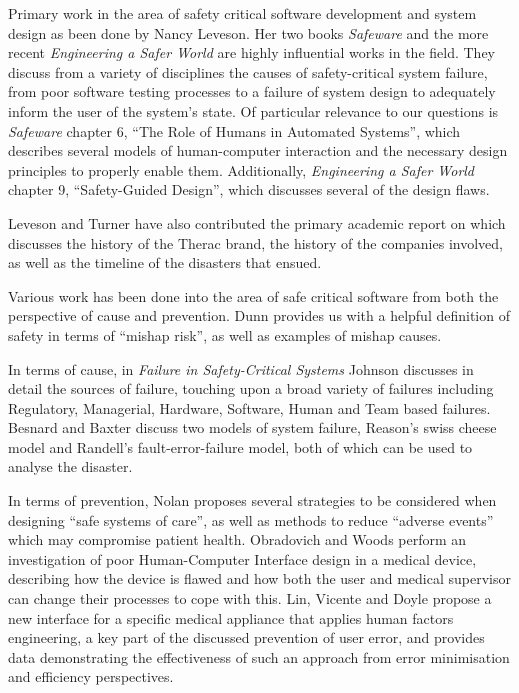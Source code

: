 \documentclass{cshonours}
\begin{document}
Primary work in the area of safety critical software development and system design as been done by Nancy Leveson. Her two books \textit{Safeware} \cite{safeware} and the more recent \textit{Engineering a Safer World} \cite{saferworld} are highly influential works in the field. They discuss from a variety of disciplines the causes of safety-critical system failure, from poor software testing processes to a failure of system design to adequately inform the user of the system's state. Of particular relevance to our \ther questions is \textit{Safeware} chapter 6, ``The Role of Humans in Automated Systems'', which describes several models of human-computer interaction and the necessary design principles to properly enable them. Additionally, \textit{Engineering a Safer World} chapter 9, ``Safety-Guided Design'', which discusses several of the \ther design flaws.

Leveson and Turner have also contributed the primary academic report on \ther \cite{leveson1993investigation} which discusses the history of the Therac brand, the history of the companies involved, as well as the timeline of the disasters that ensued.

Various work has been done into the area of safe critical software from both the perspective of cause and prevention. Dunn \cite{dunn2003designing} provides us with a helpful definition of safety in terms of ``mishap risk'', as well as examples of mishap causes.

In terms of cause, in \textit{Failure in Safety-Critical Systems} \cite[ch.~3]{johnson2003failure} Johnson discusses in detail the sources of failure, touching upon a broad variety of failures including Regulatory, Managerial, Hardware, Software, Human and Team based failures. Besnard and Baxter \etal \cite{besnard2003human} discuss two models of system failure, Reason's swiss cheese model and Randell's fault-error-failure model, both of which can be used to analyse the \ther disaster.

In terms of prevention, Nolan \cite{nolan2000system} proposes several strategies to be considered when designing ``safe systems of care'', as well as methods to reduce ``adverse events''  which may compromise patient health. Obradovich and Woods \cite{obradovich1996users} perform an investigation of poor Human-Computer Interface design in a medical device, describing how the device is flawed and how both the user and medical supervisor can change their processes to cope with this. Lin, Vicente and Doyle \cite{lin2001patient} propose a new interface for a specific medical appliance that applies human factors engineering, a key part of the discussed prevention of user error, and provides data demonstrating the effectiveness of such an approach from error minimisation and efficiency perspectives.
\end{document}
